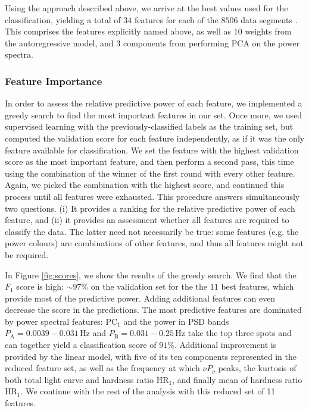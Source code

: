 \documentclass[12pt]{emulateapj}
\begin{document}
Using the approach described above, we arrive at the best values used for the classification, yielding a total of $34$ features for each of the $8506$ data segments . This comprises the features explicitly named above, as well as $10$ weights from the autoregressive model, and $3$ components from performing PCA on the power spectra.

\subsubsection{Feature Importance}

In order to assess the relative predictive power of each feature, we implemented a greedy search to find the most important features in our set. 
Once more, we used supervised learning with the previously-classified labels as the training set, but computed the validation score for each feature independently, as if it was the only feature available for classification. We set the feature with the highest validation score as the most important feature, and then perform a second pass, this time using the combination of the winner of the first round with every other feature. Again, we picked the combination with the highest score, and continued this process until all features were exhausted. This procedure answers simultaneously two questions. (i) It provides a ranking for the relative predictive power of each feature, and (ii) it provides an assessment whether all features are required to classify the data. The latter need not necessarily be true: some features (e.g. the power colours) are combinations of other features, and thus all features might not be required.

In Figure \ref{fig:scores}, we show the results of the greedy search. We find that the $F_1$ score is high: $\sim\!\! 97\%$ on the validation set for the the $11$ best features, which provide most of the predictive power. Adding additional features can even decrease the score in the predictions. The most predictive features are dominated by power spectral features: $\mathrm{PC}_1$ and the power in PSD bands  $P_\mathrm{A} = 0.0039-0.031 \,\mathrm{Hz}$ and $P_\mathrm{B} = 0.031-0.25 \,\mathrm{Hz}$ take the top three spots and can together yield a classification score of $91\%$. Additional improvement is provided by the linear model, with five of its ten components represented in the reduced feature set, as well as the frequency at which $\nu P_\nu$ peaks, the kurtosis of both total light curve and hardness ratio $\mathrm{HR}_1$, and finally mean of hardness ratio $\mathrm{HR}_1$. We continue with the rest of the analysis with this reduced set of 11 features.
\end{document}
